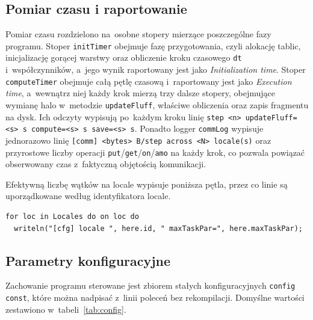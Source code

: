 \subsection{Pomiar czasu i raportowanie}
\label{sec:pomiary}

Pomiar czasu rozdzielono na~osobne stopery mierzące poszczególne fazy programu.
Stoper \texttt{initTimer} obejmuje fazę przygotowania, czyli alokację tablic, inicjalizację gorącej warstwy oraz obliczenie kroku czasowego \texttt{dt} i~współczynników, a~jego wynik raportowany jest jako \emph{Initialization time}.
Stoper \texttt{computeTimer} obejmuje całą pętlę czasową i~raportowany jest jako \emph{Execution time}, a~wewnątrz niej każdy krok mierzą trzy dalsze stopery, obejmujące wymianę halo w~metodzie \texttt{updateFluff}, właściwe obliczenia oraz zapis fragmentu na dysk.
Ich odczyty wypisują po~każdym kroku linię \texttt{step <n>\ updateFluff=<s> s\ compute=<s> s\ save=<s> s}.
Ponadto logger \texttt{commLog} wypisuje jednorazowo linię \texttt{[comm] <bytes> B/step across <N> locale(s)} oraz przyrostowe liczby operacji \texttt{put}/\texttt{get}/\texttt{on}/\texttt{amo} na każdy krok, co pozwala powiązać obserwowany czas z~faktyczną objętością komunikacji.

Efektywną liczbę wątków na locale wypisuje poniższa pętla, przez co linie są uporządkowane według identyfikatora locale.

\begin{lstlisting}[language=Chapel, caption={Wypisanie efektywnej liczby wątków dla każdego locale.}, label={lst:cfg}]
for loc in Locales do on loc do
  writeln("[cfg] locale ", here.id, " maxTaskPar=", here.maxTaskPar);
\end{lstlisting}

\subsection{Parametry konfiguracyjne}

Zachowanie programu sterowane jest zbiorem stałych konfiguracyjnych \texttt{config const}, 
które można nadpisać z~linii poleceń bez rekompilacji. 
Domyślne wartości zestawiono w~tabeli~\ref{tab:config}.

